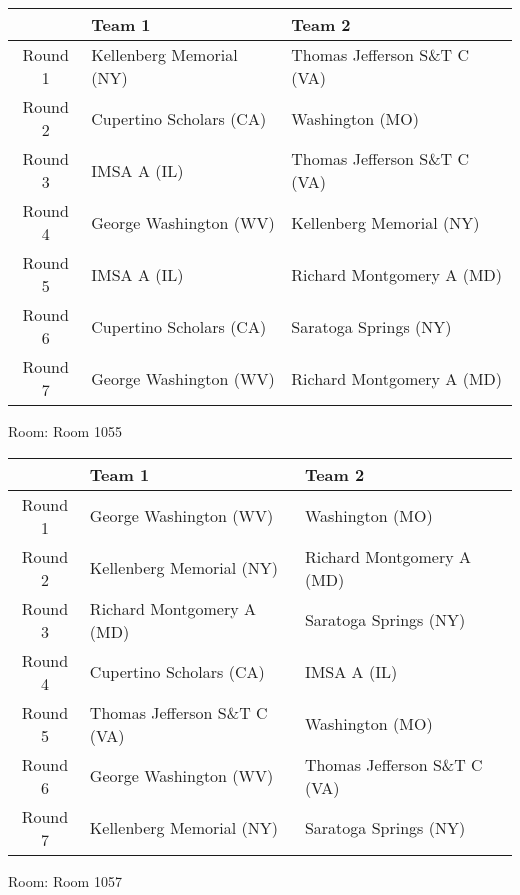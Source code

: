 \documentclass{article}%
\begin{document}
\begin{tabularx}{\textwidth}{|c|Y|Y|}%
\hline%
&Team 1&Team 2\\%
\hline%
Round 1&Kellenberg Memorial (NY)&Thomas Jefferson S\&T C (VA)\\%
Round 2&Cupertino Scholars (CA)&Washington (MO)\\%
Round 3&IMSA A (IL)&Thomas Jefferson S\&T C (VA)\\%
Round 4&George Washington (WV)&Kellenberg Memorial (NY)\\%
Round 5&IMSA A (IL)&Richard Montgomery A (MD)\\%
Round 6&Cupertino Scholars (CA)&Saratoga Springs (NY)\\%
Round 7&George Washington (WV)&Richard Montgomery A (MD)\\%
\hline%
\end{tabularx}%
\vspace*{8pt}%
\linebreak%
\begin{flushleft}%
\begin{Large}%
Room: Room 1055%
\end{Large}%
\end{flushleft}%
\begin{tabularx}{\textwidth}{|c|Y|Y|}%
\hline%
&Team 1&Team 2\\%
\hline%
Round 1&George Washington (WV)&Washington (MO)\\%
Round 2&Kellenberg Memorial (NY)&Richard Montgomery A (MD)\\%
Round 3&Richard Montgomery A (MD)&Saratoga Springs (NY)\\%
Round 4&Cupertino Scholars (CA)&IMSA A (IL)\\%
Round 5&Thomas Jefferson S\&T C (VA)&Washington (MO)\\%
Round 6&George Washington (WV)&Thomas Jefferson S\&T C (VA)\\%
Round 7&Kellenberg Memorial (NY)&Saratoga Springs (NY)\\%
\hline%
\end{tabularx}%
\vspace*{8pt}%
\linebreak%
\begin{flushleft}%
\begin{Large}%
Room: Room 1057%
\end{Large}%
\end{flushleft}%
\end{document}
